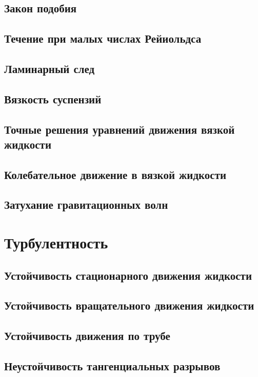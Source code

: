 \documentclass[12pt,a4paper]{book}
\begin{document}
\section{Закон подобия}\label{sec:p19}
\section{Течение при малых числах Рейиольдса}\label{sec:p20}
\section{Ламинарный след}\label{sec:p21}
\section{Вязкость суспензий}\label{sec:p22}
\section{Точные решения уравнений движения вязкой жидкости}\label{sec:p23}
\section{Колебательное движение в вязкой жидкости}\label{sec:p24}
\section{Затухание гравитационных волн}\label{sec:p25}

\chapter{Турбулентность}
\section{Устойчивость стационарного движения жидкости}\label{sec:p26}
\section{Устойчивость вращательного движения жидкости}\label{sec:p27}
\section{Устойчивость движения по трубе}\label{sec:p28}
\section{Неустойчивость тангенциальных разрывов}\label{sec:p29}
\end{document}
